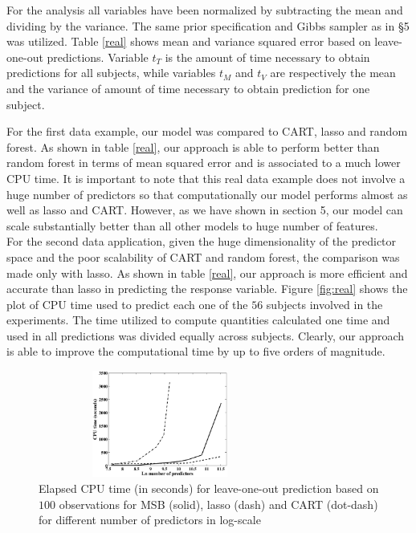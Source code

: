 \documentclass{article}
\begin{document}
For the analysis all variables have been normalized by subtracting the mean and dividing by the variance. The same prior specification and Gibbs sampler as in \S 5 was  utilized. Table \ref{real} shows mean and variance squared error based on leave-one-out predictions. Variable $t_{T}$ is the amount of time necessary to obtain predictions for all subjects, while variables $t_M$ and $t_V$ are respectively the mean and the variance of amount of time necessary to obtain prediction for one subject.

 For the first data example, our model was compared to CART, lasso and random forest. As shown in table \ref{real}, our approach is able to perform better than random forest in terms of mean squared error and is associated to a much lower CPU time. It is important to note that this real data example does not involve a huge number of predictors so that computationally our model performs almost as well as lasso and CART. However, as we have shown in section 5, our model can scale substantially better than all other models to huge number of features. \\
 
 For the second data application, given the huge dimensionality of the predictor space and the poor scalability of CART and random forest, the comparison was made only with lasso. As shown in table \ref{real}, our approach is more efficient and accurate than lasso in predicting the response variable. Figure \ref{fig:real} shows the plot of CPU time used to predict each one of the $56$ subjects involved in the experiments. The time utilized to compute quantities calculated one time and used in all predictions was divided equally across subjects. Clearly, our approach is able to improve the computational time by up to five orders of magnitude.


\newpage
\nocite{langley00}



\begin{figure}
\centering
\includegraphics[width=80mm,height=35mm]{Cpu.eps}
\caption{Elapsed CPU time (in seconds) for leave-one-out prediction based on $100$ observations for MSB (solid), lasso (dash) and CART (dot-dash) for different number of predictors in log-scale} \label{Cpu}
\end{figure}
\end{document}
